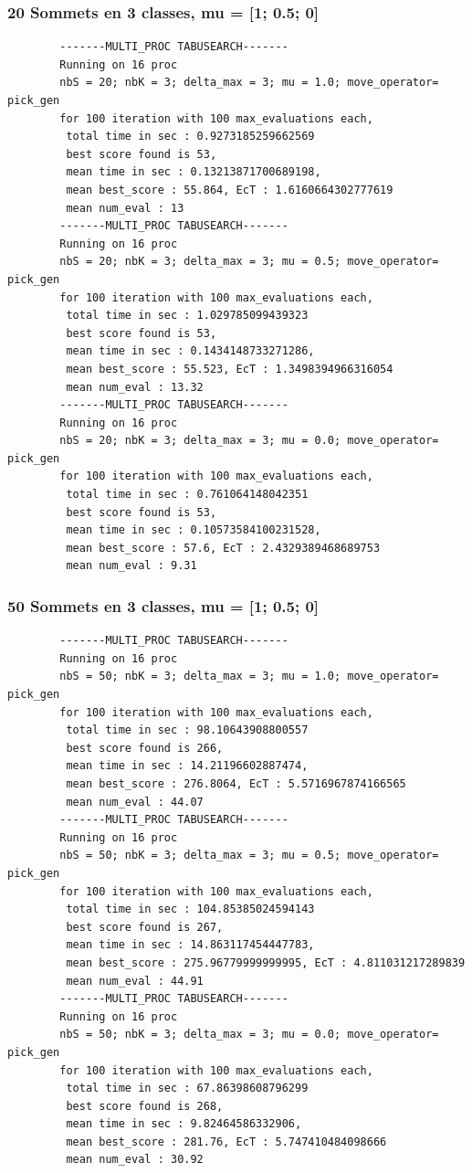 \documentclass[a4paper]{article}
\begin{document}
		\subsubsection{20 Sommets en 3 classes, mu = [1; 0.5; 0]}
		\begin{verbatim}
		-------MULTI_PROC TABUSEARCH-------
		Running on 16 proc
		nbS = 20; nbK = 3; delta_max = 3; mu = 1.0; move_operator= pick_gen
		for 100 iteration with 100 max_evaluations each, 
		 total time in sec : 0.9273185259662569
		 best score found is 53,
		 mean time in sec : 0.13213871700689198,
		 mean best_score : 55.864, EcT : 1.6160664302777619
		 mean num_eval : 13
		-------MULTI_PROC TABUSEARCH-------
		Running on 16 proc
		nbS = 20; nbK = 3; delta_max = 3; mu = 0.5; move_operator= pick_gen
		for 100 iteration with 100 max_evaluations each, 
		 total time in sec : 1.029785099439323
		 best score found is 53,
		 mean time in sec : 0.1434148733271286,
		 mean best_score : 55.523, EcT : 1.3498394966316054
		 mean num_eval : 13.32
		-------MULTI_PROC TABUSEARCH-------
		Running on 16 proc
		nbS = 20; nbK = 3; delta_max = 3; mu = 0.0; move_operator= pick_gen
		for 100 iteration with 100 max_evaluations each, 
		 total time in sec : 0.761064148042351
		 best score found is 53,
		 mean time in sec : 0.10573584100231528,
		 mean best_score : 57.6, EcT : 2.4329389468689753
		 mean num_eval : 9.31
		\end{verbatim}
		\subsubsection{50 Sommets en 3 classes, mu = [1; 0.5; 0]}
		\begin{verbatim}
		-------MULTI_PROC TABUSEARCH-------
		Running on 16 proc
		nbS = 50; nbK = 3; delta_max = 3; mu = 1.0; move_operator= pick_gen
		for 100 iteration with 100 max_evaluations each, 
		 total time in sec : 98.10643908800557
		 best score found is 266,
		 mean time in sec : 14.21196602887474,
		 mean best_score : 276.8064, EcT : 5.5716967874166565
		 mean num_eval : 44.07
		-------MULTI_PROC TABUSEARCH-------
		Running on 16 proc
		nbS = 50; nbK = 3; delta_max = 3; mu = 0.5; move_operator= pick_gen
		for 100 iteration with 100 max_evaluations each, 
		 total time in sec : 104.85385024594143
		 best score found is 267,
		 mean time in sec : 14.863117454447783,
		 mean best_score : 275.96779999999995, EcT : 4.811031217289839
		 mean num_eval : 44.91
		-------MULTI_PROC TABUSEARCH-------
		Running on 16 proc
		nbS = 50; nbK = 3; delta_max = 3; mu = 0.0; move_operator= pick_gen
		for 100 iteration with 100 max_evaluations each, 
		 total time in sec : 67.86398608796299
		 best score found is 268,
		 mean time in sec : 9.82464586332906,
		 mean best_score : 281.76, EcT : 5.747410484098666
		 mean num_eval : 30.92
		\end{verbatim}
\end{document}
